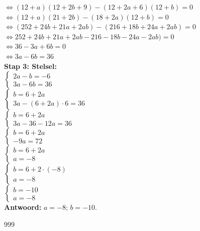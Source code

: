 \documentclass[a4paper]{article}
\begin{document}
$\Leftrightarrow (12+a)(12+2b+9)-(12+2a+6)(12+b)=0$\\

$\Leftrightarrow (12+a)(21+2b)-(18+2a)(12+b)=0$\\

$\Leftrightarrow (252+24b+21a+2ab)-(216+18b+24a+2ab)=0$\\

$\Leftrightarrow 252+24b+21a+2ab-216-18b-24a-2ab)=0$\\

$\Leftrightarrow 36-3a+6b=0$\\

$\Leftrightarrow 3a-6b=36$\\

\textbf{Stap 3: Stelsel:} \\

$\left\{
\begin{array}{l}
2a - b = -6 \\
3a - 6b = 36
\end{array}
\right.$\\

$\left\{
\begin{array}{l}
b  =  6+2a \\
3a - (6+2a)\cdot 6  =  36
\end{array}
\right.$\\

$\left\{
\begin{array}{l}
b  =  6+2a \\
3a -36 -12a =  36
\end{array}
\right.$\\

$\left\{
\begin{array}{l}
b = 6+2a \\
-9a = 72
\end{array}
\right.$\\

$\left\{
\begin{array}{l}
b = 6+2a \\
a = -8
\end{array}
\right.$\\

$\left\{
\begin{array}{l}
b = 6+2 \cdot (-8)  \\
a = -8
\end{array}
\right.$\\

$\left\{
\begin{array}{l}
b = -10  \\
a = -8
\end{array}
\right.$\\

\textbf{Antwoord:} $a = -8$; $b = -10$.



\begin{thebibliography}{999}
\end{thebibliography}
\end{document}
